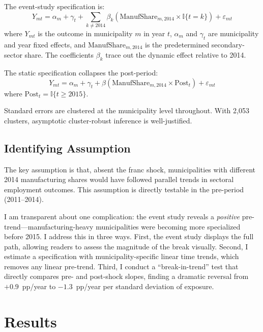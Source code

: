 \documentclass[12pt]{article}
\newcommand{\ind}{\mathbb{I}}
\begin{document}
The event-study specification is:
\begin{equation}
Y_{mt} = \alpha_m + \gamma_t + \sum_{k \neq 2014} \beta_k \left( \text{ManufShare}_{m,2014} \times \ind\{t = k\} \right) + \varepsilon_{mt}
\label{eq:eventstudy}
\end{equation}
where $Y_{mt}$ is the outcome in municipality $m$ in year $t$, $\alpha_m$ and $\gamma_t$ are municipality and year fixed effects, and $\text{ManufShare}_{m,2014}$ is the predetermined secondary-sector share. The coefficients $\beta_k$ trace out the dynamic effect relative to 2014.

The static specification collapses the post-period:
\begin{equation}
Y_{mt} = \alpha_m + \gamma_t + \beta \left( \text{ManufShare}_{m,2014} \times \text{Post}_t \right) + \varepsilon_{mt}
\label{eq:static}
\end{equation}
where $\text{Post}_t = \ind\{t \geq 2015\}$.

Standard errors are clustered at the municipality level throughout. With 2,053 clusters, asymptotic cluster-robust inference is well-justified.

\subsection{Identifying Assumption}

The key assumption is that, absent the franc shock, municipalities with different 2014 manufacturing shares would have followed parallel trends in sectoral employment outcomes. This assumption is directly testable in the pre-period (2011--2014).

I am transparent about one complication: the event study reveals a \textit{positive} pre-trend---manufacturing-heavy municipalities were becoming more specialized before 2015. I address this in three ways. First, the event study displays the full path, allowing readers to assess the magnitude of the break visually. Second, I estimate a specification with municipality-specific linear time trends, which removes any linear pre-trend. Third, I conduct a ``break-in-trend'' test that directly compares pre- and post-shock slopes, finding a dramatic reversal from $+0.9$~pp/year to $-1.3$~pp/year per standard deviation of exposure.


\section{Results}
\label{sec:results}
\end{document}
